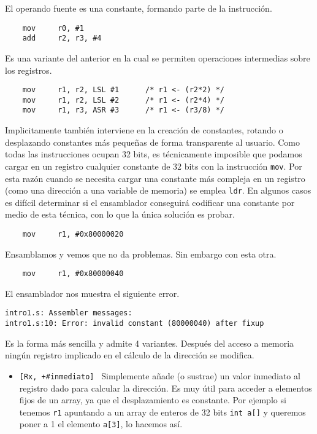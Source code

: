 \begin{descript}
  \item[Direccionamiento inmediato.]
    El operando fuente es una constante, formando parte de la instrucción.
\begin{lstlisting}
    mov     r0, #1
    add     r2, r3, #4
\end{lstlisting}
  \item[Direccionamiento inmediato con desplazamiento o rotación.]
    Es una variante del anterior en la cual se permiten operaciones intermedias
    sobre los registros.
\begin{lstlisting}
    mov     r1, r2, LSL #1      /* r1 <- (r2*2) */
    mov     r1, r2, LSL #2      /* r1 <- (r2*4) */
    mov     r1, r3, ASR #3      /* r1 <- (r3/8) */
\end{lstlisting}
    Implicitamente también interviene en la creación de constantes, rotando o
    desplazando constantes más pequeñas de forma transparente al usuario. Como todas
    las instrucciones ocupan 32 bits, es técnicamente imposible que podamos cargar
    en un registro cualquier constante de 32 bits con la instrucción {\tt mov}. Por
    esta razón cuando se necesita cargar una constante más compleja en un registro
    (como una dirección a una variable de memoria) se emplea {\tt ldr}. En algunos
    casos es difícil determinar si el ensamblador conseguirá codificar una constante
    por medio de esta técnica, con lo que la única solución es probar.
\begin{lstlisting}
    mov     r1, #0x80000020
\end{lstlisting}
    Ensamblamos y vemos que no da problemas. Sin embargo con esta otra.
\begin{lstlisting}
    mov     r1, #0x80000040
\end{lstlisting}
    El ensamblador nos muestra el siguiente error.
\begin{lstlisting}
intro1.s: Assembler messages:
intro1.s:10: Error: invalid constant (80000040) after fixup
\end{lstlisting}

  \item[Direccionamiento a memoria, sin actualizar registro puntero.]
    Es la forma más sencilla y admite 4 variantes. Después del acceso
    a memoria ningún registro implicado en el cálculo de la dirección
    se modifica.
\begin{itemize}
  \item{\tt [Rx, +\#inmediato] \newline
            [Rx, -\#inmediato] \newline}
    Simplemente añade (o sustrae) un valor inmediato al registro dado
    para calcular la dirección. Es muy útil para acceder a elementos
    fijos de un array, ya que el desplazamiento es constante. Por
    ejemplo si tenemos {\tt r1} apuntando a un array de enteros de
    32 bits {\tt int a[]} y queremos poner a 1 el
    elemento {\tt a[3]}, lo hacemos así.


\end{itemize}
\end{descript}
